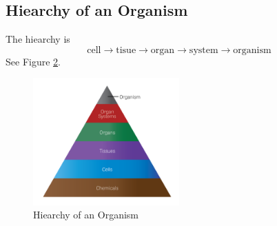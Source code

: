 \documentclass[12pt]{report}
\begin{document}
\begin{figure}[!htb] %
    \centering
    \qquad
    \label{fig:example}
\end{figure}

\subsection{Hiearchy of an Organism}
\begin{definition}
    The hiearchy is 
    \[
        \text{cell}\to \text{tisue}\to \text{organ}\to \text{system}\to \text{organism}
    \]
    See Figure \ref{fig:hierachy}.
\end{definition}

\begin{figure}[H]
\centering
    \includegraphics[width=0.5\textwidth]{../figures/hiearchy.png}
    \caption{Hiearchy of an Organism}
    \label{fig:hierachy}
\end{figure}
\end{document}
